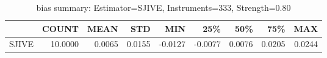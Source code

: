 \begin{table}[ht]
\centering
\caption{bias summary: Estimator=SJIVE, Instruments=333, Strength=0.80}
\begin{tabular}{lrrrrrrrr}
\toprule
 & COUNT & MEAN & STD & MIN & 25\% & 50\% & 75\% & MAX \\
\midrule
SJIVE & 10.0000 & 0.0065 & 0.0155 & -0.0127 & -0.0077 & 0.0076 & 0.0205 & 0.0244 \\
\bottomrule
\end{tabular}
\end{table}
